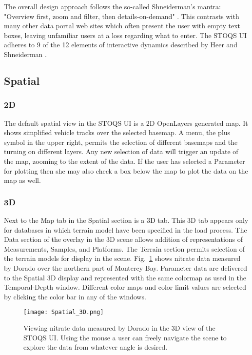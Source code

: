\documentclass[conference]{IEEEtran}
\begin{document}
The overall design approach follows the so-called Shneiderman's mantra: "Overview first, 
zoom and filter, then details-on-demand" \cite{Whitney:2012:DIN:2597850}. This contrasts 
with many other data portal web sites which often present the user with empty text boxes, 
leaving unfamiliar users at a loss regarding what to enter. The STOQS UI adheres to 9 
of the 12 elements of interactive dynamics described by Heer and Shneiderman 
\cite{Heer:2012:IDV:2133416.2146416}.


\subsection{Spatial}

\subsubsection{2D}
The default spatial view in the STOQS UI is a 2D OpenLayers generated map. It shows 
simplified vehicle tracks over the selected basemap. A menu, the plus symbol
in the upper right, permits the selection of different basemaps and the turning
on different layers. Any new selection of data will trigger an update
of the map, zooming to the extent of the data. If the user has selected a Parameter for plotting
then she may also check a box below the map to plot the data on the map as well.

\subsubsection{3D}
Next to the Map tab in the Spatial section is a 3D tab. This 3D tab appears 
only for databases in which terrain model have been specified in the load process. 
The Data section of
the overlay in the 3D scene allows addition of representations of Measurements,
Samples, and Platforms. The Terrain section permits selection of the terrain
models for display in the scene. Fig.~\ref{fig:Spatial_3D} shows nitrate data 
measured by Dorado over the northern part of Monterey Bay. 
Parameter data are delivered to the Spatial 3D display and represented with the same
colormap as used in the Temporal-Depth window. Different color maps and color limit
values are selected by clicking the color bar in any of the windows.

\begin{figure}[htbp]
\centering
\texttt{[image: Spatial\_3D.png]}
\caption{Viewing nitrate data measured by Dorado in the 3D view of the STOQS UI.
Using the mouse a user can freely navigate the scene to explore the data from 
whatever angle is desired.}
\label{fig:Spatial_3D}
\end{figure}
\end{document}
